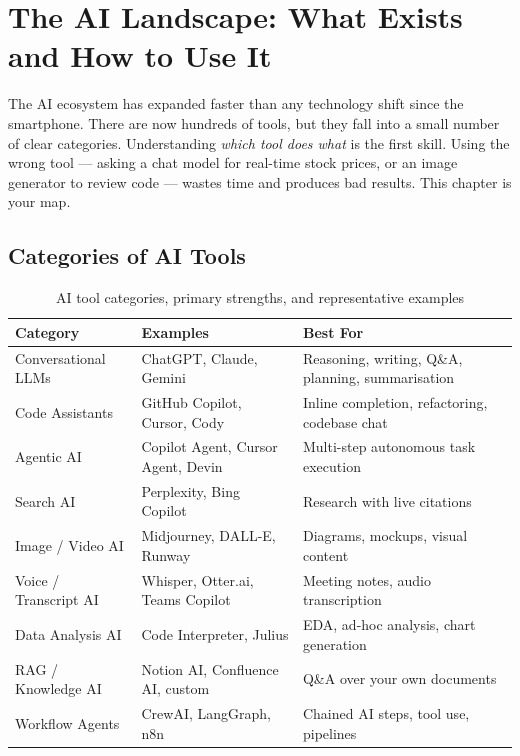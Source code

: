 \chapter{The AI Landscape: What Exists and How to Use It}
\label{ch:overview}

The AI ecosystem has expanded faster than any technology shift since the smartphone.
There are now hundreds of tools, but they fall into a small number of clear categories.
Understanding \emph{which tool does what} is the first skill.
Using the wrong tool --- asking a chat model for real-time stock prices, or an image
generator to review code --- wastes time and produces bad results.
This chapter is your map.

\section{Categories of AI Tools}
\label{sec:categories}

\begin{table}[htbp]
\centering
\caption{AI tool categories, primary strengths, and representative examples}
\begin{tabularx}{\linewidth}{l l X}
\toprule
\textbf{Category} & \textbf{Examples} & \textbf{Best For} \\
\midrule
Conversational LLMs    & ChatGPT, Claude, Gemini   & Reasoning, writing, Q\&A, planning, summarisation \\[4pt]
Code Assistants        & GitHub Copilot, Cursor, Cody & Inline completion, refactoring, codebase chat \\[4pt]
Agentic AI             & Copilot Agent, Cursor Agent, Devin & Multi-step autonomous task execution \\[4pt]
Search AI              & Perplexity, Bing Copilot  & Research with live citations \\[4pt]
Image / Video AI       & Midjourney, DALL-E, Runway & Diagrams, mockups, visual content \\[4pt]
Voice / Transcript AI  & Whisper, Otter.ai, Teams Copilot & Meeting notes, audio transcription \\[4pt]
Data Analysis AI       & Code Interpreter, Julius  & EDA, ad-hoc analysis, chart generation \\[4pt]
RAG / Knowledge AI     & Notion AI, Confluence AI, custom & Q\&A over your own documents \\[4pt]
Workflow Agents        & CrewAI, LangGraph, n8n    & Chained AI steps, tool use, pipelines \\
\bottomrule
\end{tabularx}
\label{tab:ai-categories}
\end{table}

